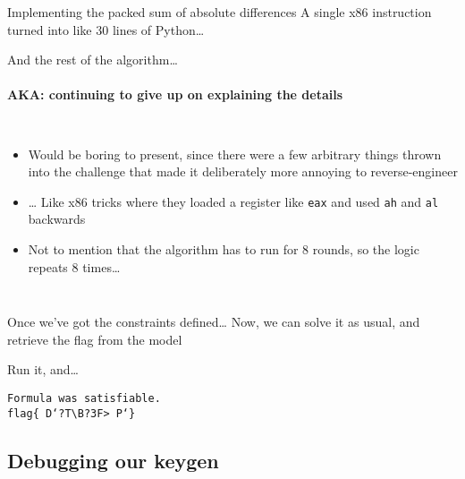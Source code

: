 \begin{frame}{Implementing the packed sum of absolute differences}
    A single x86 instruction turned into like 30 lines of Python\ldots \\
    \pause
\end{frame}

\begin{frame}{And the rest of the algorithm\ldots}
    \framesubtitle{AKA: continuing to give up on explaining the details}
    \begin{columns}

        \begin{itemize}
            \item Would be boring to present, since there were a few arbitrary
                  things thrown into the challenge that made it deliberately
                  more annoying to reverse-engineer
            \item \ldots\xspace Like x86 tricks where they loaded a register
                  like \texttt{eax} and used \texttt{ah} and \texttt{al}
                  backwards
            \item Not to mention that the algorithm has to run for 8
                  rounds, so the logic repeats 8 times\ldots
        \end{itemize}
    \end{columns}
\end{frame}

\begin{frame}{Once we've got the constraints defined\ldots}
    Now, we can solve it as usual, and retrieve the flag from the model \\
    \pause
\end{frame}

\begin{frame}{Run it, and\ldots}
    \begin{center}
        {\Large
            \texttt{Formula was satisfiable.} \\
            \texttt{flag\{ D`?T\textbackslash{}B?3F>~P`\}}
        }
    \end{center}
\end{frame}

\subsection{Debugging our keygen}

